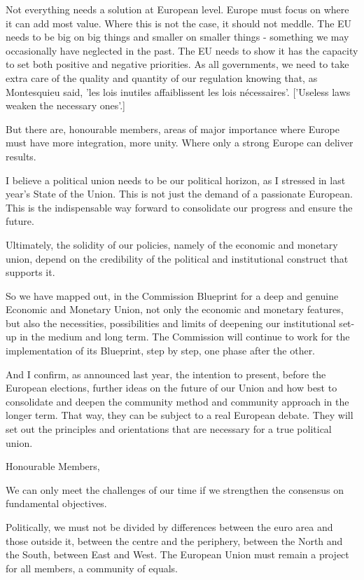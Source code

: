 \documentclass[a4paper,11pt]{article}
\begin{document}
Not everything needs a solution at European level. Europe must focus on where it can add most value. Where this is not the case, it should not meddle. The EU needs to be big on big things and smaller on smaller things - something we may occasionally have neglected in the past. The EU needs to show it has the capacity to set both positive and negative priorities. As all governments, we need to take extra care of the quality and quantity of our regulation knowing that, as Montesquieu said, 'les lois inutiles affaiblissent les lois nécessaires'. ['Useless laws weaken the necessary ones'.]

But there are, honourable members, areas of major importance where Europe must have more integration, more unity. Where only a strong Europe can deliver results.

I believe a political union needs to be our political horizon, as I stressed in last year's State of the Union. This is not just the demand of a passionate European. This is the indispensable way forward to consolidate our progress and ensure the future.

Ultimately, the solidity of our policies, namely of the economic and monetary union, depend on the credibility of the political and institutional construct that supports it.

So we have mapped out, in the Commission Blueprint for a deep and genuine Economic and Monetary Union, not only the economic and monetary features, but also the necessities, possibilities and limits of deepening our institutional set-up in the medium and long term. The Commission will continue to work for the implementation of its Blueprint, step by step, one phase after the other.

And I confirm, as announced last year, the intention to present, before the European elections, further ideas on the future of our Union and how best to consolidate and deepen the community method and community approach in the longer term. That way, they can be subject to a real European debate. They will set out the principles and orientations that are necessary for a true political union.

Honourable Members,

We can only meet the challenges of our time if we strengthen the consensus on fundamental objectives.

Politically, we must not be divided by differences between the euro area and those outside it, between the centre and the periphery, between the North and the South, between East and West. The European Union must remain a project for all members, a community of equals.
\end{document}
